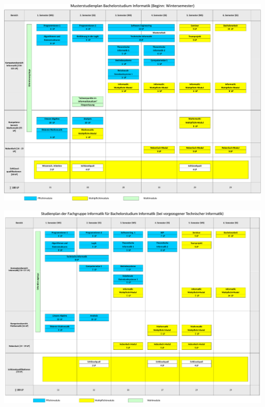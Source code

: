 \begin{minipage}[H]{1.0\linewidth}
	\begin{center}     
	\label{musterstudienplan}
	\includegraphics[angle=90, totalheight=\textheight, width=\textwidth ]{bilder/studienplan_bsc_ws/muster_erste_ws-crop}
	\end{center}  
\end{minipage}
\newpage

\begin{minipage}[H]{1.0\linewidth}
\begin{center} 
		\includegraphics[angle=90, height=\textheight, width=\textwidth ]{bilder/studienplan_bsc_ws/ws2015/BScInformatikWS1516-fginfo-tech_scissored}
		\label{studienplan_tech}
\end{center}
\end{minipage}
\newpage

